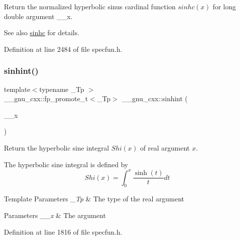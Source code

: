 Return the normalized hyperbolic sinus cardinal function $ sinhc(x) $ for {\ttfamily long double} argument {\ttfamily \+\_\+\+\_\+x}.

\begin{DoxySeeAlso}{See also}
\hyperlink{group__gnu__math__spec__func_gaf2f02e4143e7beb97352cef4b7fcb663}{sinhc} for details. 
\end{DoxySeeAlso}


Definition at line 2484 of file specfun.\+h.

\mbox{\label{group__gnu__math__spec__func_gab5cbc831c5fab99a967c03d059f1ad59}} 
\subsubsection{\texorpdfstring{sinhint()}{sinhint()}}
{\footnotesize\ttfamily template$<$typename \+\_\+\+Tp $>$ \\
\+\_\+\+\_\+gnu\+\_\+cxx\+::fp\+\_\+promote\+\_\+t$<$\+\_\+\+Tp$>$ \+\_\+\+\_\+gnu\+\_\+cxx\+::sinhint (\begin{DoxyParamCaption}\item[{\+\_\+\+Tp}]{\+\_\+\+\_\+x }\end{DoxyParamCaption})\hspace{0.3cm}{\ttfamily [inline]}}

Return the hyperbolic sine integral $ Shi(x) $ of real argument $ x $.

The hyperbolic sine integral is defined by \[ Shi(x) = \int_0^x \frac{\sinh(t)}{t}dt \]


\begin{DoxyTemplParams}{Template Parameters}
{\em \+\_\+\+Tp} & The type of the real argument \\
\hline
\end{DoxyTemplParams}

\begin{DoxyParams}{Parameters}
{\em \+\_\+\+\_\+x} & The argument \\
\hline
\end{DoxyParams}


Definition at line 1816 of file specfun.\+h.

\mbox{\label{group__gnu__math__spec__func_ga375ca3ceb1eafd678e298d0aea4bb3e6}} 
